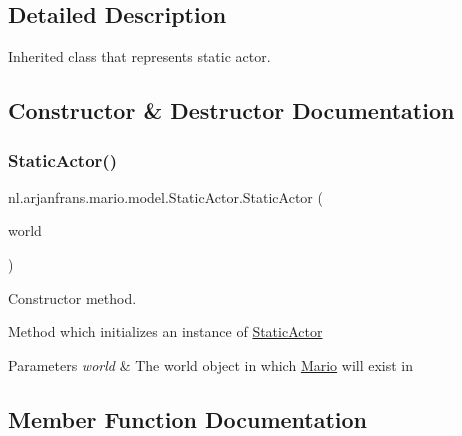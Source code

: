 \subsection{Detailed Description}
Inherited class that represents static actor. 

\subsection{Constructor \& Destructor Documentation}
\mbox{\label{classnl_1_1arjanfrans_1_1mario_1_1model_1_1StaticActor_aa558f637b07d753909e51f5cebe6168c}} 
\subsubsection{\texorpdfstring{Static\+Actor()}{StaticActor()}}
{\footnotesize\ttfamily nl.\+arjanfrans.\+mario.\+model.\+Static\+Actor.\+Static\+Actor (\begin{DoxyParamCaption}\item[{\hyperlink{classnl_1_1arjanfrans_1_1mario_1_1model_1_1World}{World}}]{world }\end{DoxyParamCaption})}



Constructor method. 

Method which initializes an instance of \hyperlink{classnl_1_1arjanfrans_1_1mario_1_1model_1_1StaticActor}{Static\+Actor} 
\begin{DoxyParams}{Parameters}
{\em world} & The world object in which \hyperlink{classnl_1_1arjanfrans_1_1mario_1_1model_1_1Mario}{Mario} will exist in \\
\hline
\end{DoxyParams}


\subsection{Member Function Documentation}
\mbox{\label{classnl_1_1arjanfrans_1_1mario_1_1model_1_1StaticActor_af44668107f69c1ec7547a7fb36537c43}} 
